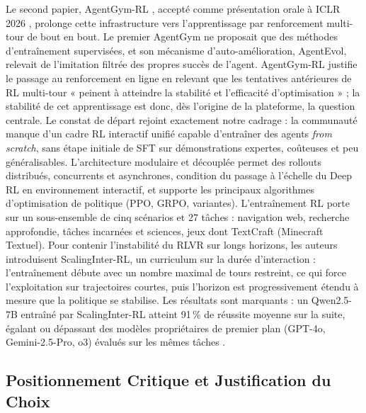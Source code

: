 \documentclass[11pt,a4paper]{article}
\begin{document}
Le second papier, AgentGym-RL \cite{xi_agentgym-rl_2025}, accepté comme présentation orale à ICLR 2026 \cite{xi_agentgymrl_openreview}, prolonge cette infrastructure vers l'apprentissage par renforcement multi-tour de bout en bout. Le premier AgentGym ne proposait que des méthodes d'entraînement supervisées, et son mécanisme d'auto-amélioration, AgentEvol, relevait de l'imitation filtrée des propres succès de l'agent. AgentGym-RL justifie le passage au renforcement en ligne en relevant que les tentatives antérieures de RL multi-tour « peinent à atteindre la stabilité et l'efficacité d'optimisation » ; la stabilité de cet apprentissage est donc, dès l'origine de la plateforme, la question centrale.
Le constat de départ rejoint exactement notre cadrage : la communauté manque d'un cadre RL interactif unifié capable d'entraîner des agents \emph{from scratch}, sans étape initiale de SFT sur démonstrations expertes, coûteuses et peu généralisables. L'architecture modulaire et découplée permet des rollouts distribués, concurrents et asynchrones, condition du passage à l'échelle du Deep RL en environnement interactif, et supporte les principaux algorithmes d'optimisation de politique (PPO, GRPO, variantes). L'entraînement RL porte sur un sous-ensemble de cinq scénarios et 27 tâches : navigation web, recherche approfondie, tâches incarnées et sciences, jeux dont TextCraft (Minecraft Textuel). Pour contenir l'instabilité du RLVR sur longs horizons, les auteurs introduisent ScalingInter-RL, un curriculum sur la durée d'interaction : l'entraînement débute avec un nombre maximal de tours restreint, ce qui force l'exploitation sur trajectoires courtes, puis l'horizon est progressivement étendu à mesure que la politique se stabilise. Les résultats sont marquants : un Qwen2.5-7B entraîné par ScalingInter-RL atteint 91\,\% de réussite moyenne sur la suite, égalant ou dépassant des modèles propriétaires de premier plan (GPT-4o, Gemini-2.5-Pro, o3) évalués sur les mêmes tâches \cite{xi_agentgym-rl_2025}.

\subsection{Positionnement Critique et Justification du Choix}
\end{document}
